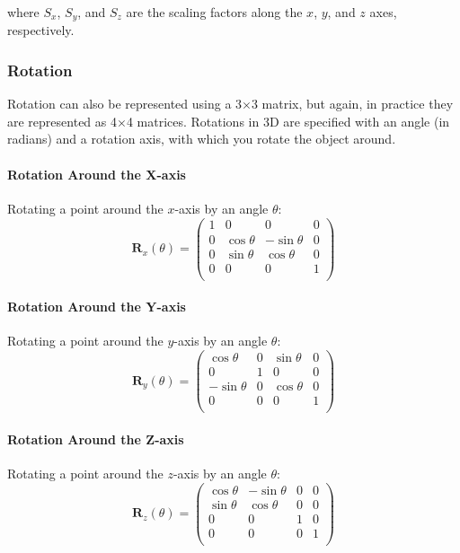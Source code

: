 \documentclass[12pt]{article}
\begin{document}
where \( S_x \), \( S_y \), and \( S_z \) are the scaling factors along the \( x \), \( y \), and \( z \) axes, respectively.

\subsubsection{Rotation}

Rotation can also be represented using a 3$\times$3 matrix, but again, in practice they are represented as 4$\times$4 matrices.
Rotations in 3D are specified with an angle (in radians) and a rotation axis, with which you rotate the object around.

\paragraph{Rotation Around the X-axis}

Rotating a point around the \(x\)-axis by an angle \(\theta\):
\[
    \mathbf{R}_x(\theta) = \begin{pmatrix}
        1 & 0           & 0            & 0 \\
        0 & \cos \theta & -\sin \theta & 0 \\
        0 & \sin \theta & \cos \theta  & 0 \\
        0 & 0           & 0            & 1 \\
    \end{pmatrix}
\]

\paragraph{Rotation Around the Y-axis}
Rotating a point around the \(y\)-axis by an angle \(\theta\):
\[
    \mathbf{R}_y(\theta) = \begin{pmatrix}
        \cos \theta  & 0 & \sin \theta & 0 \\
        0            & 1 & 0           & 0 \\
        -\sin \theta & 0 & \cos \theta & 0 \\
        0            & 0 & 0           & 1 \\
    \end{pmatrix}
\]

\paragraph{Rotation Around the Z-axis}

Rotating a point around the \(z\)-axis by an angle \(\theta\):
\[
    \mathbf{R}_z(\theta) = \begin{pmatrix}
        \cos \theta & -\sin \theta & 0 & 0 \\
        \sin \theta & \cos \theta  & 0 & 0 \\
        0           & 0            & 1 & 0 \\
        0           & 0            & 0 & 1 \\
    \end{pmatrix}
\]
\end{document}
